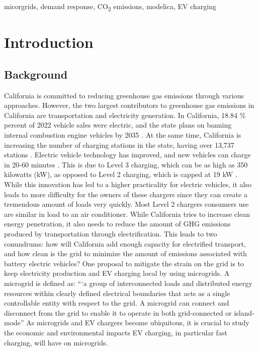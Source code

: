 \documentclass[conference]{IEEEtran}
\begin{document}
\begin{IEEEkeywords}
micorgrids, demand response, CO\textsubscript{2} emissions, modelica, EV charging
\end{IEEEkeywords}


\section{Introduction}
    \subsection{Background}
	California is committed to reducing greenhouse gas emissions through various approaches. However, the two largest contributors to greenhouse gas emissions in California are transportation and electricity generation. In California, 18.84 \% percent of 2022 vehicle sales were electric, \cite{ev_sale_percentage} and the state plans on banning internal combustion engine vehicles by 2035 \cite{ice_ban}. At the same time, California is increasing the number of charging stations in the state, having over 13,737 stations \cite{ev_stations_CA}. Electric vehicle technology has improved, and new vehicles can charge in 20-60 minutes \cite{ev_stats}. This is due to Level 3 charging, which can be as high as 350 kilowatts (kW), as opposed to Level 2 charging, which is capped at 19 kW \cite{ev_stats}. While this innovation has led to a higher practicality for electric vehicles, it also leads to more difficulty for the owners of these chargers since they can create a tremendous amount of loads very quickly. Most Level 2 chargers consumers use are similar in load to an air conditioner. While California tries to increase clean energy penetration, it also needs to reduce the amount of GHG emissions produced by transportation through electrification. This leads to two conundrums: how will California add enough capacity for electrified transport, and how clean is the grid to minimize the amount of emissions associated with battery electric vehicles? One proposal to mitigate the strain on the grid is to keep electricity production and EV charging local by using microgrids. A microgrid is defined as: “‘a group of interconnected loads and distributed energy resources within clearly defined electrical boundaries that acts as a single controllable entity with respect to the grid. A microgrid can connect and disconnect from the grid to enable it to operate in both grid-connected or island-mode” As microgrids and EV chargers become ubiquitous, it is crucial to study the economic and environmental impacts EV charging, in particular fast charging, will have on microgrids.
\end{document}
